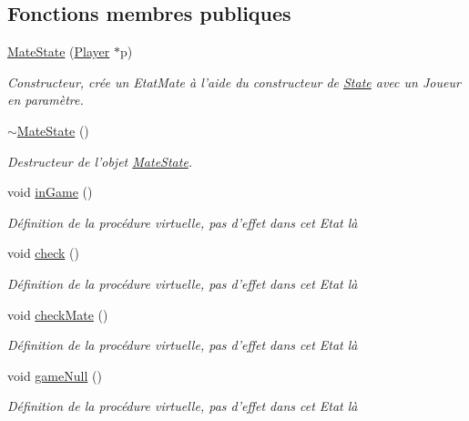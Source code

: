 \subsection*{Fonctions membres publiques}
\begin{DoxyCompactItemize}
\item 
\hyperlink{class_mate_state_aa4a8a6d8614ffddaeac5cf19b2707136}{Mate\-State} (\hyperlink{class_player}{Player} $\ast$p)
\begin{DoxyCompactList}\small\item\em Constructeur, crée un Etat\-Mate à l'aide du constructeur de \hyperlink{class_state}{State} avec un Joueur en paramètre. \end{DoxyCompactList}\item 
\hyperlink{class_mate_state_af75f5df59f008abe5e1913e1d55acbad}{$\sim$\-Mate\-State} ()
\begin{DoxyCompactList}\small\item\em Destructeur de l'objet \hyperlink{class_mate_state}{Mate\-State}. \end{DoxyCompactList}\item 
void \hyperlink{class_mate_state_a99575ed4587f029511bc5bd1ec9ab262}{in\-Game} ()
\begin{DoxyCompactList}\small\item\em Définition de la procédure virtuelle, pas d'effet dans cet Etat là \end{DoxyCompactList}\item 
void \hyperlink{class_mate_state_a2205b5879c63fcdf469002d9d5203bb3}{check} ()
\begin{DoxyCompactList}\small\item\em Définition de la procédure virtuelle, pas d'effet dans cet Etat là \end{DoxyCompactList}\item 
void \hyperlink{class_mate_state_af785a3407109dd3d0a6868a358c92213}{check\-Mate} ()
\begin{DoxyCompactList}\small\item\em Définition de la procédure virtuelle, pas d'effet dans cet Etat là \end{DoxyCompactList}\item 
void \hyperlink{class_mate_state_a59ad17cb3366c560b921619d52f00181}{game\-Null} ()
\begin{DoxyCompactList}\small\item\em Définition de la procédure virtuelle, pas d'effet dans cet Etat là \end{DoxyCompactList}\item 

\end{DoxyCompactItemize}
